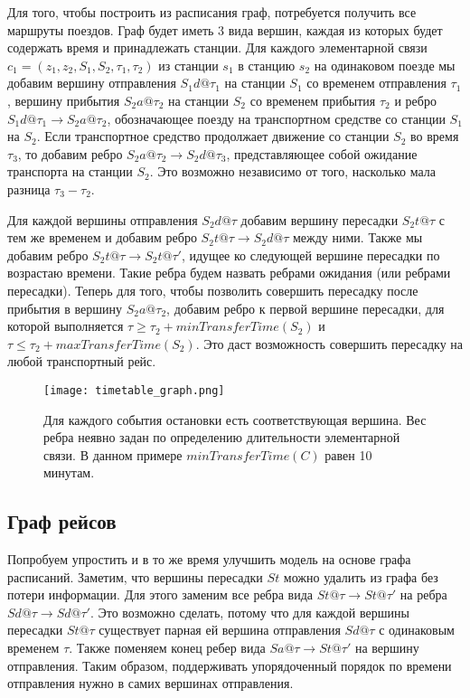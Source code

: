Для того, чтобы построить из расписания граф, потребуется получить все маршруты поездов. Граф будет иметь 3 вида вершин, каждая из которых будет содержать время и принадлежать станции. Для каждого элементарной связи $c_1=(z_1, z_2, S_1, S_2, \tau_1, \tau_2)$ из станции $s_1$ в станцию $s_2$ на одинаковом поезде мы добавим вершину отправления $S_1d@\tau_1$ на станции $S_1$ со временем отправления $\tau_1$, вершину прибытия $S_2a@\tau_2$ на станции $S_2$ со временем прибытия $\tau_2$ и ребро $S_1d@\tau_1 \rightarrow S_2a@\tau_2$, обозначающее поезду на транспортном средстве со станции $S_1$ на $S_2$. Если транспортное средство продолжает движение со станции $S_2$ во время $\tau_3$, то добавим ребро $S_2a@\tau_2 \rightarrow S_2d@\tau_3$, представляющее собой ожидание транспорта на станции $S_2$. Это возможно независимо от того, насколько мала разница $\tau_3-\tau_2$.

Для каждой вершины отправления $S_2d@\tau$ добавим вершину пересадки $S_2t@\tau$ с тем же временем и добавим ребро $S_2t@\tau \rightarrow S_2d@\tau$ между ними. Также мы добавим ребро $S_2t@\tau \rightarrow S_2t@\tau'$, идущее ко следующей вершине пересадки по возрастаю времени. Такие ребра будем назвать ребрами ожидания (или ребрами пересадки). Теперь для того, чтобы позволить совершить пересадку после прибытия в вершину $S_2a@\tau_2$, добавим ребро к первой вершине пересадки, для которой выполняется $\tau \geqslant \tau_2 + minTransferTime(S_2)$ и $\tau \leqslant \tau_2 + maxTransferTime(S_2)$. Это даст возможность совершить пересадку на любой транспортный рейс.
 
\begin{figure}[!h]
	\centering
	\texttt{[image: timetable\_graph.png]}
	\caption{Для каждого события остановки есть соответствующая вершина. Вес ребра неявно задан по определению длительности элементарной связи. В данном примере $minTransferTime(C)$ равен 10 минутам.}\label{fig4}
\end{figure}
\FloatBarrier 
 
\subsection{Граф рейсов}
Попробуем упростить и в то же время улучшить модель на основе графа расписаний. Заметим, что вершины пересадки $St$ можно удалить из графа без потери информации. Для этого заменим все ребра вида $St@\tau \rightarrow St@\tau'$ на ребра $Sd@\tau \rightarrow Sd@\tau'$. Это возможно сделать, потому что для каждой вершины пересадки $St@\tau$ существует парная ей вершина отправления $Sd@\tau$ с одинаковым временем $\tau$. Также поменяем конец ребер вида $Sa@\tau \rightarrow St@\tau'$ на вершину отправления. Таким образом, поддерживать упорядоченный порядок по времени отправления нужно в самих вершинах отправления.

